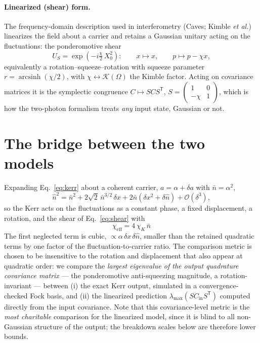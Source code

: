 \documentclass[11pt]{article}
\newcommand{\nbar}{\bar{n}}
\newcommand{\chieff}{\chi_{\mathrm{eff}}}
\newcommand{\chiK}{\chi_{K}}
\begin{document}
\paragraph{Linearized (shear) form.} The frequency-domain description used
in interferometry (Caves; Kimble \emph{et al.}) linearizes the field about
a carrier and retains a Gaussian unitary acting on the fluctuations: the
ponderomotive shear
\begin{equation}
  U_S = \exp\!\left(-i \tfrac{\chi}{2}\, X_0^{2}\right):
  \qquad x \mapsto x, \qquad p \mapsto p - \chi x ,
  \label{eq:shear}
\end{equation}
equivalently a rotation--squeeze--rotation with squeeze parameter
$r = \operatorname{arcsinh}(\chi/2)$, with $\chi \leftrightarrow
\mathcal{K}(\Omega)$ the Kimble factor. Acting on covariance matrices it is
the symplectic congruence $C \mapsto S C S^{\mathsf T}$,
$S = \begin{pmatrix} 1 & 0 \\ -\chi & 1 \end{pmatrix}$, which is how the
two-photon formalism treats \emph{any} input state, Gaussian or not.

\section{The bridge between the two models}

Expanding Eq.~\eqref{eq:kerr} about a coherent carrier, $a = \alpha +
\delta a$ with $\nbar = \alpha^{2}$,
\begin{equation}
  \hat n^{2} = \nbar^{2}
  + 2\sqrt{2}\,\nbar^{3/2}\, \delta x
  + 2\nbar\left(\delta x^{2} + \delta \hat n\right)
  + \mathcal{O}(\delta^{3}),
\end{equation}
so the Kerr acts on the fluctuations as a constant phase, a fixed
displacement, a rotation, and the shear of Eq.~\eqref{eq:shear} with
\begin{equation}
  \boxed{\;\chieff = 4\,\chiK\,\nbar\;}
  \label{eq:bridge}
\end{equation}
The first neglected term is cubic, $\propto \alpha\,\delta x\,\delta\hat
n$, smaller than the retained quadratic terms by one factor of the
fluctuation-to-carrier ratio. The comparison metric is chosen to be
insensitive to the rotation and displacement that also appear at quadratic
order: we compare the \emph{largest eigenvalue of the output quadrature
covariance matrix} --- the ponderomotive anti-squeezing magnitude, a
rotation-invariant --- between (i) the exact Kerr output, simulated in a
convergence-checked Fock basis, and (ii) the linearized prediction
$\lambda_{\max}(S C_{\mathrm{in}} S^{\mathsf T})$ computed directly from
the input covariance. Note that this covariance-level metric is the
\emph{most charitable} comparison for the linearized model, since it is
blind to all non-Gaussian structure of the output; the breakdown scales
below are therefore lower bounds.
\end{document}
